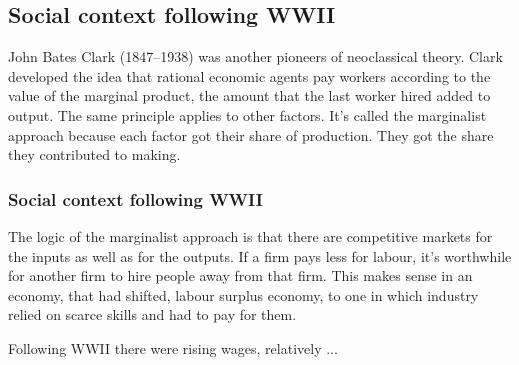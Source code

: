 \subsection{Social context following WWII}
John Bates Clark (1847--1938) was another %
pioneers of neoclassical theory. %
Clark developed the idea %
that rational economic agents pay workers according to the value of the marginal product, the amount that the last worker hired added to output.  %
The same principle applies to other factors.   
It's called the \gls{marginalist} approach because each factor got their share of production. They got the share they contributed to making. 





\subsubsection{Social context following WWII}

The logic of the \gls{marginalist} approach is that there are competitive markets for the inputs as well as for the outputs. If a firm pays less for labour, it's worthwhile for another firm to hire people away from that firm.
This makes sense in an economy, that had shifted, labour surplus economy, to one in which industry relied on scarce skills and had to pay for them.

Following WWII there were rising wages, relatively ...

